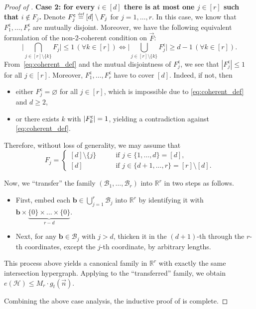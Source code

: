 \documentclass[11pt]{article}
\theoremstyle{definition}
\newcommand*{\eqdef}{\stackrel{\mbox{\normalfont\tiny def}}{=}} %
\DeclarePairedDelimiter\abs{\lvert}{\rvert}                     %
\newcommand*{\R}{\mathbb{R}}                                    %
\newcommand*{\cH}{\mathcal{H}}
\newcommand*{\vF}{\vec{F}}
\newcommand*{\cB}{\mathcal{B}}
\newcommand*{\vn}{\vec{n}}
\renewcommand*{\sc}{\mathsf{c}}
\begin{document}
\begin{proof}[Proof of ]
    \medskip
    \noindent\textbf{Case 2: for every $i \in [d]$ there is at most one $j \in [r]$ such that $i\notin F_{j}$.} Denote $F_j^{\sc} \eqdef [d] \setminus F_j$ for $j = 1, \dots, r$. In this case, we know that $F_1^{\sc}, \dots, F_r^{\sc}$ are mutually disjoint. Moreover, we have the following equivalent formulation of the non-2-coherent condition on $\vF$:
    \begin{equation} \label{eq:coherent_def}
        \Biggl| \bigcap_{j \in [r] \setminus \{k\}} F_j \Biggr| \le 1 \, (\forall k \in [r]) \iff \Biggl| \bigcup_{j \in [r] \setminus \{k\}} F_j^{\sc} \Biggr| \ge d - 1 \, (\forall k \in [r]). 
    \end{equation}
    From~\eqref{eq:coherent_def} and the mutual disjointness of $F_j^{\sc}$, we see that $|F_j^{\sc}| \le 1$ for all $j \in [r]$. Moreover, $F_1^{\sc}, \dots, F_r^{\sc}$ have to cover $[d]$. Indeed, if not, then
    \vspace{-0.5em}
    \begin{itemize}
        \item either $F_j^{\sc} = \varnothing$ for all $j \in [r]$, which is impossible due to \eqref{eq:coherent_def} and $d \ge 2$, 
        \vspace{-0.5em}
        \item or there exists $k$ with $\abs{F_k^{\sc}} = 1$, yielding a contradiction against \eqref{eq:coherent_def}. 
    \end{itemize}
    \vspace{-0.5em}
    Therefore, without loss of generality, we may assume that \[
    F_j = \begin{cases}
        [d] \setminus \{j\} \qquad &\text{if $j \in \{1, \dots, d\} = [d]$}, \\
        [d] \qquad &\text{if $j \in \{d + 1, \dots, r\} = [r] \setminus [d]$}. 
    \end{cases}
    \]
    
    Now, we ``transfer'' the family $(\cB_1, \dots, \cB_r)$ into $\R^r$ in two steps as follows. 
    \vspace{-0.5em}
    \begin{itemize}
        \item First, embed each $\bm{b} \in \bigcup_{j=1}^r \cB_j$ into $\R^r$ by identifying it with $\bm{b} \times \underbrace{\{0\} \times \dots \times \{0\}}_{r-d}$. 
        \vspace{-0.5em}
        \item Next, for any $\bm{b} \in \cB_j$ with $j > d$, thicken it in the $(d+1)$-th through the $r$-th coordinates, except the $j$-th coordinate, by arbitrary lengths. 
    \end{itemize}
    \vspace{-0.5em}
    This process above yields a canonical family in $\R^r$ with exactly the same intersection hypergraph. Applying  to the ``transferred'' family, we obtain $e(\cH) \le M_r \cdot g_t(\vn)$. 

    \medskip
    Combining the above case analysis, the inductive proof of  is complete. 
\end{proof}
\end{document}
